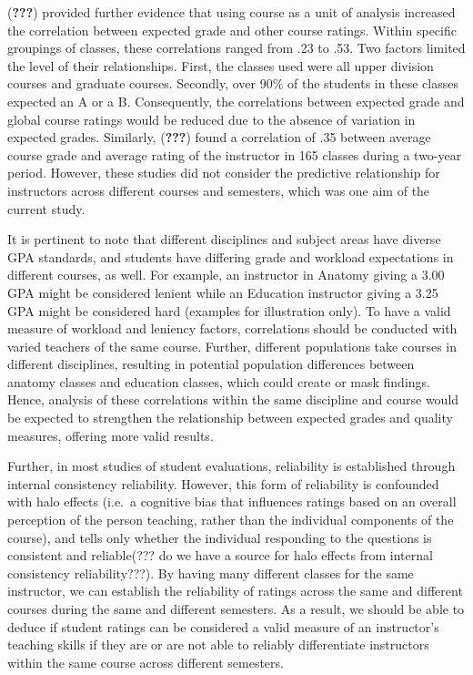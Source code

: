 \documentclass[man]{apa6}
\theoremstyle{definition}
\theoremstyle{definition}
\theoremstyle{definition}
\theoremstyle{remark}
\begin{document}
({\textbf{???}}) provided further evidence that using course as a unit
of analysis increased the correlation between expected grade and other
course ratings. Within specific groupings of classes, these correlations
ranged from .23 to .53. Two factors limited the level of their
relationships. First, the classes used were all upper division courses
and graduate courses. Secondly, over 90\% of the students in these
classes expected an A or a B. Consequently, the correlations between
expected grade and global course ratings would be reduced due to the
absence of variation in expected grades. Similarly, ({\textbf{???}})
found a correlation of .35 between average course grade and average
rating of the instructor in 165 classes during a two-year period.
However, these studies did not consider the predictive relationship for
instructors across different courses and semesters, which was one aim of
the current study.

It is pertinent to note that different disciplines and subject areas
have diverse GPA standards, and students have differing grade and
workload expectations in different courses, as well. For example, an
instructor in Anatomy giving a 3.00 GPA might be considered lenient
while an Education instructor giving a 3.25 GPA might be considered hard
(examples for illustration only). To have a valid measure of workload
and leniency factors, correlations should be conducted with varied
teachers of the same course. Further, different populations take courses
in different disciplines, resulting in potential population differences
between anatomy classes and education classes, which could create or
mask findings. Hence, analysis of these correlations within the same
discipline and course would be expected to strengthen the relationship
between expected grades and quality measures, offering more valid
results.

Further, in most studies of student evaluations, reliability is
established through internal consistency reliability. However, this form
of reliability is confounded with halo effects (i.e.~a cognitive bias
that influences ratings based on an overall perception of the person
teaching, rather than the individual components of the course), and
tells only whether the individual responding to the questions is
consistent and reliable(??? do we have a source for halo effects from
internal consistency reliability???). By having many different classes
for the same instructor, we can establish the reliability of ratings
across the same and different courses during the same and different
semesters. As a result, we should be able to deduce if student ratings
can be considered a valid measure of an instructor's teaching skills if
they are or are not able to reliably differentiate instructors within
the same course across different semesters.
\end{document}
